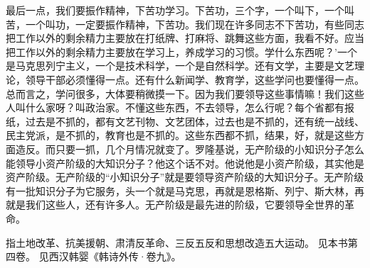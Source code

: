 最后一点，我们要振作精神，下苦功学习。下苦功，三个字，一个叫下，一个叫苦，一个叫功，一定要振作精神，下苦功。我们现在许多同志不下苦功，有些同志把工作以外的剩余精力主要放在打纸牌、打麻将、跳舞这些方面，我看不好。应当把工作以外的剩余精力主要放在学习上，养成学习的习惯。学什么东西呢？’一个是马克思列宁主义，一个是技术科学，一个是自然科学。还有文学，主要是文艺理论，领导干部必须懂得一点。还有什么新闻学、教育学，这些学问也要懂得一点。总而言之，学问很多，大体要稍微摸一下。因为我们要领导这些事情嘛！我们这些人叫什么家呀？叫政治家。不懂这些东西，不去领导，怎么行呢？每个省都有报纸，过去是不抓的，都有文艺刊物、文艺团体，过去也是不抓的，还有统一战线、民主党派，是不抓的，教育也是不抓的。这些东西都不抓，结果，好，就是这些方面造反。而只要一抓，几个月情况就变了。罗隆基说，无产阶级的小知识分子怎么能领导小资产阶级的大知识分子？他这个话不对。他说他是小资产阶级，其实他是资产阶级。无产阶级的“小知识分子”就是要领导资产阶级的大知识分子。无产阶级有一批知识分子为它服务，头一个就是马克思，再就是恩格斯、列宁、斯大林，再就是我们这些人，还有许多人。无产阶级是最先进的阶级，它要领导全世界的革命。


\begin{maonote}
指土地改革、抗美援朝、肃清反革命、三反五反和思想改造五大运动。
见本书第四卷。
见西汉韩婴《韩诗外传·卷九》。
\end{maonote}
